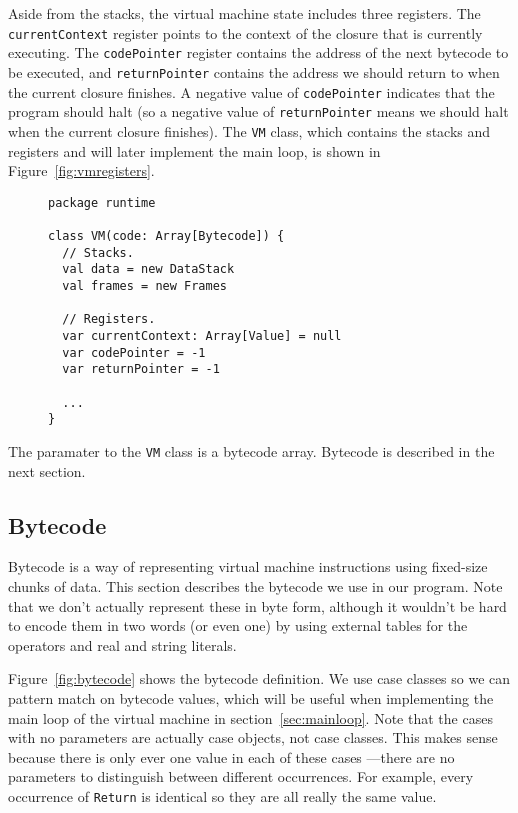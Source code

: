 Aside from the stacks,
the virtual machine state includes three registers.
The \verb!currentContext! register points to
the context of the closure that is currently executing.
The \verb!codePointer! register contains
the address of the next bytecode to be executed,
and \verb!returnPointer! contains
the address we should return to when the current closure finishes.
A negative value of \verb!codePointer!
indicates that the program should halt
(so a negative value of \verb!returnPointer! means we should halt
when the current closure finishes).
The \verb!VM! class,
which contains the stacks and registers
and will later implement the main loop,
is shown in Figure~\ref{fig:vmregisters}.

\begin{figure}
\begin{verbatim}
package runtime

class VM(code: Array[Bytecode]) {
  // Stacks.
  val data = new DataStack
  val frames = new Frames

  // Registers.
  var currentContext: Array[Value] = null
  var codePointer = -1
  var returnPointer = -1

  ...
}
\end{verbatim}
\getcaption
\end{figure}

The paramater to the \verb!VM! class is a bytecode array.
Bytecode is described in the next section.


\subsection{Bytecode\label{sec:bytecode}}

Bytecode is a way of representing virtual machine instructions
using fixed-size chunks of data.
This section describes the bytecode we use in our program.
Note that we don't actually represent these in byte form,
although it wouldn't be hard to encode them in two words
(or even one)
by using external tables for the operators and
real and string literals.

Figure~\ref{fig:bytecode} shows the bytecode definition.
We use case classes so we can pattern match on bytecode values,
which will be useful when implementing the main loop of the virtual machine
in section~\ref{sec:mainloop}.
Note that the cases with no parameters are actually case objects,
not case classes.
This makes sense because there is only ever one value in each of these cases%
---there are no parameters to distinguish between different occurrences.
For example, every occurrence of \verb!Return! is identical
so they are all really the same value.

